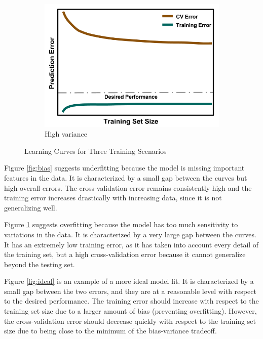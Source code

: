 \begin{figure}[!hp]
\begin{subfigure}[h]{0.65\linewidth}
    \includegraphics[width=\linewidth]{./chapters/litrev/LearningCurve-variance.png}
    \caption{High variance}
    \label{fig:variance}
  \end{subfigure}
  \caption{Learning Curves for Three Training Scenarios}
  \label{fig:learning}
\end{figure}

Figure \ref{fig:bias} suggests underfitting because the model is missing
important features in the data. It is characterized by a small gap between the
curves but high overall errors. The cross-validation error remains consistently
high and the training error increases drastically with increasing data, since
it is not generalizing well. 

Figure \ref{fig:variance} suggests overfitting because the model has too much
sensitivity to variations in the data. It is characterized by a very large gap
between the curves. It has an extremely low training error, as it has taken
into account every detail of the training set, but a high cross-validation
error because it cannot generalize beyond the testing set. 

Figure \ref{fig:ideal} is an example of a more ideal model fit. It is
characterized by a small gap between the two errors, and they are at a
reasonable level with respect to the desired performance.  The training error
should increase with respect to the training set size due to a larger amount of
bias (preventing overfitting). However, the cross-validation error should decrease
quickly with respect to the training set size due to being close to the minimum
of the bias-variance tradeoff. 



